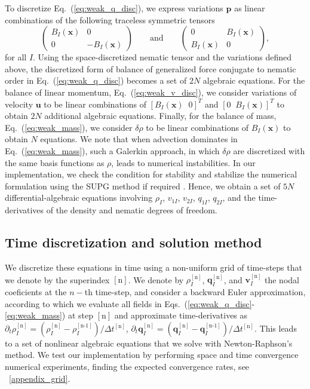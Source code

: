 \documentclass[12pt]{iopart}
\begin{document}
	To discretize Eq.~(\ref{eq:weak_q_disc}), we express variations $\bm{p}$ as linear combinations of the following traceless symmetric tensors 
	\begin{equation}
		\left(\begin{array}{cc}
			B_I(\bm{x}) & 0\\
			0 & -B_I(\bm{x})
		\end{array}\right) \qquad \mbox{and} \qquad  \left(\begin{array}{cc}
			0 & B_I(\bm{x})\\
			B_I(\bm{x}) & 0
		\end{array}\right),
	\end{equation}
	for all $I$.  Using the space-discretized nematic tensor and the variations defined above, the discretized form of balance of generalized force conjugate to nematic order in Eq.~(\ref{eq:weak_q_disc}) becomes a set of $2N$  algebraic equations. For the balance of linear momentum, Eq.~(\ref{eq:weak_v_disc}), we consider variations of velocity $\bm{u}$ to be linear combinations of $[B_I(\bm{x})\;\; 0]^T$ and $[0\;\; B_I(\bm{x})]^T$ to obtain $2N$ additional algebraic equations. Finally, for the balance of mass, Eq.~(\ref{eq:weak_mass}), we consider $\delta\rho$ to be linear combinations of $B_I(\bm{x})$ to obtain $N$ equations. We note that when advection dominates in Eq.~(\ref{eq:weak_mass}), such a Galerkin approach, in which $\delta\rho$ are discretized with the same basis functions as $\rho$, leads to numerical instabilities. In our implementation, we check the condition for stability and stabilize the numerical formulation using the SUPG method if required \cite{donea2003}.  Hence, we obtain a set of $5N$ differential-algebraic equations involving $\rho_I$, $v_{1I}$, $v_{2I}$, $q_{1I}$, $q_{2I}$, and the time-derivatives of the density and nematic degrees of freedom.
	
	
	\subsection{Time discretization and solution method}
	
	
	We discretize these equations in time using a non-uniform grid of time-steps that we denote by the superindex $[\text{n}]$. We denote by $\rho^{[\text{n}]}_I$, $\bm{q}^{[\text{n}]}_I$, and $\bm{v}^{[\text{n}]}_I$ the nodal coeficients at the $n-$th time-step, and consider  a backward Euler approximation, according to which we evaluate all fields in Eqs.~(\ref{eq:weak_q_disc}-\ref{eq:weak_mass}) at step $[\text{n}]$ and approximate time-derivatives as $\partial_t \rho_I^{[\text{n}]} = (\rho^{[\text{n}]}_I-\rho^{[\text{n-1}]}_I)/\Delta t^{[\text{n}]}$, $\partial_t \bm{q}_I^{[\text{n}]} = (\bm{q}^{[\text{n}]}_I-\bm{q}^{[\text{n-1}]}_I)/\Delta t^{[\text{n}]}$. This leads to a set of nonlinear algebraic equations that we solve with Newton-Raphson's method. 
	We test our implementation by performing space and time convergence numerical experiments, finding the expected convergence rates, see ~\ref{appendix_grid}.
	
\end{document}
